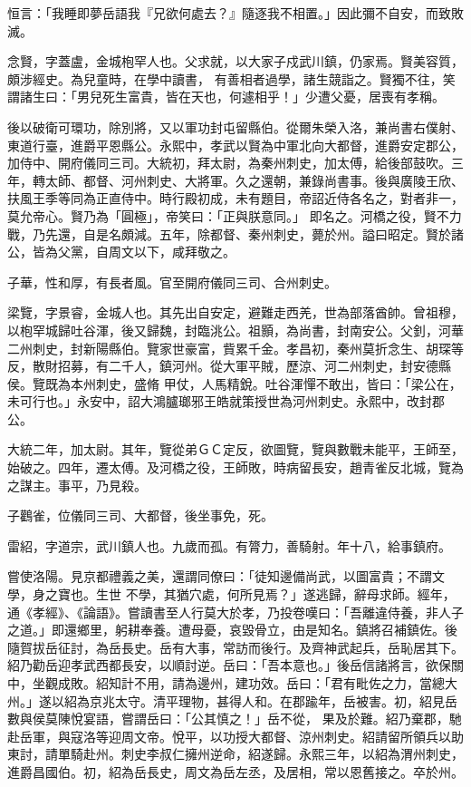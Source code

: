 \begin{pinyinscope}
 恒言：「我睡即夢岳語我『兄欲何處去？』隨逐我不相置。」因此彌不自安，而致敗滅。



 念賢，字蓋盧，金城枹罕人也。父求就，以大家子戍武川鎮，仍家焉。賢美容質，頗涉經史。為兒童時，在學中讀書，
 有善相者過學，諸生競詣之。賢獨不往，笑謂諸生曰：「男兒死生富貴，皆在天也，何遽相乎！」少遭父憂，居喪有孝稱。



 後以破衛可環功，除別將，又以軍功封屯留縣伯。從爾朱榮入洛，兼尚書右僕射、東道行臺，進爵平恩縣公。永熙中，孝武以賢為中軍北向大都督，進爵安定郡公，加侍中、開府儀同三司。大統初，拜太尉，為秦州刺史，加太傅，給後部鼓吹。三年，轉太師、都督、河州刺史、大將軍。久之還朝，兼錄尚書事。後與廣陵王欣、扶風王季等同為正直侍中。時行殿初成，未有題目，帝詔近侍各名之，對者非一，莫允帝心。賢乃為「圓極」，帝笑曰：「正與朕意同。」
 即名之。河橋之役，賢不力戰，乃先還，自是名頗減。五年，除都督、秦州刺史，薨於州。謚曰昭定。賢於諸公，皆為父黨，自周文以下，咸拜敬之。



 子華，性和厚，有長者風。官至開府儀同三司、合州刺史。



 梁覽，字景睿，金城人也。其先出自安定，避難走西羌，世為部落酋帥。曾祖穆，以枹罕城歸吐谷渾，後又歸魏，封臨洮公。祖顥，為尚書，封南安公。父釗，河華二州刺史，封新陽縣伯。覽家世豪富，貲累千金。孝昌初，秦州莫折念生、胡琛等反，散財招募，有二千人，鎮河州。從大軍平賊，歷涼、河二州刺史，封安德縣侯。覽既為本州刺史，盛脩
 甲仗，人馬精銳。吐谷渾憚不敢出，皆曰：「梁公在，未可行也。」永安中，詔大鴻臚瑯邪王皓就策授世為河州刺史。永熙中，改封郡公。



 大統二年，加太尉。其年，覽從弟ＧＣ定反，欲圖覽，覽與數戰未能平，王師至，始破之。四年，遷太傅。及河橋之役，王師敗，時病留長安，趙青雀反北城，覽為之謀主。事平，乃見殺。



 子鸛雀，位儀同三司、大都督，後坐事免，死。



 雷紹，字道宗，武川鎮人也。九歲而孤。有膂力，善騎射。年十八，給事鎮府。



 嘗使洛陽。見京都禮義之美，還謂同僚曰：「徒知邊備尚武，以圖富貴；不謂文學，身之寶也。生世
 不學，其猶穴處，何所見焉？」遂逃歸，辭母求師。經年，通《孝經》、《論語》。嘗讀書至人行莫大於孝，乃投卷嘆曰：「吾離違侍養，非人子之道。」即還鄉里，躬耕奉養。遭母憂，哀毀骨立，由是知名。鎮將召補鎮佐。後隨賀拔岳征討，為岳長史。岳有大事，常訪而後行。及齊神武起兵，岳恥居其下。紹乃勸岳迎孝武西都長安，以順討逆。岳曰：「吾本意也。」後岳信諸將言，欲保關中，坐觀成敗。紹知計不用，請為邊州，建功效。岳曰：「君有毗佐之力，當總大州。」遂以紹為京兆太守。清平理物，甚得人和。在郡踰年，岳被害。初，紹見岳數與侯莫陳悅宴語，嘗謂岳曰：「公其慎之！」岳不從，
 果及於難。紹乃棄郡，馳赴岳軍，與寇洛等迎周文帝。悅平，以功授大都督、涼州刺史。紹請留所領兵以助東討，請單騎赴州。刺史李叔仁擁州逆命，紹遂歸。永熙三年，以紹為渭州刺史，進爵昌國伯。初，紹為岳長史，周文為岳左丞，及居相，常以恩舊接之。卒於州。




\end{pinyinscope}
